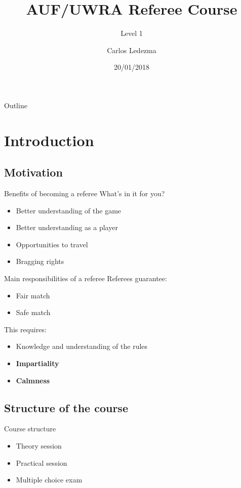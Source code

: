 \documentclass{beamer}
\title{AUF/UWRA Referee Course}
\subtitle{Level 1}
\author{Carlos Ledezma}
\date{20/01/2018}
\begin{document}
	\begin{frame}
		\titlepage
	\end{frame}

	\begin{frame}{Outline}
	\end{frame}

	\section{Introduction}
	\subsection{Motivation}

	\begin{frame}{Benefits of becoming a referee}
		What's in it for you? \pause
		\begin{itemize}
			\item Better understanding of the game \pause
			\item Better understanding as a player \pause
			\item Opportunities to travel \pause
			\item Bragging rights
		\end{itemize}
	\end{frame}

	\begin{frame}{Main responsibilities of a referee}
		\pause
		Referees guarantee:
		\begin{itemize}
			\item Fair match \pause
			\item Safe match
		\end{itemize}

		\pause

		This requires:
		\begin{itemize}
			\item Knowledge and understanding of the rules

			\pause

			\item \textbf{Impartiality}
			\item \textbf{Calmness}
		\end{itemize}
	\end{frame}

	\subsection{Structure of the course}
	\begin{frame}{Course structure}
		\begin{itemize}
			\item Theory session \pause
			\item Practical session \pause	
			\item Multiple choice exam
		\end{itemize}
	\end{frame}
\end{document}
